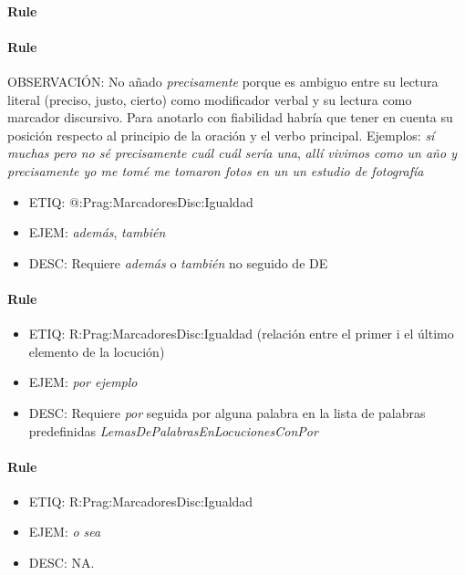 \documentclass[11pt]{report}
\begin{document}
\paragraph*{Rule}
\paragraph*{Rule}
OBSERVACIÓN: No añado \emph{precisamente} porque es ambiguo entre su lectura literal (preciso, justo, cierto) como modificador verbal y su lectura como marcador discursivo. Para anotarlo con fiabilidad habría que tener en cuenta su posición respecto al principio de la oración y el verbo principal. Ejemplos: \emph{sí muchas pero no sé precisamente cuál cuál sería una}, \emph{allí vivimos como un año y precisamente yo me tomé me tomaron fotos en un un estudio de fotografía}

\begin{itemize}
\item ETIQ: @:Prag:MarcadoresDisc:Igualdad
\item EJEM: \emph{además}, \emph{también}
\item DESC: Requiere \emph{además} o \emph{también} no seguido de DE
\end{itemize}

\paragraph*{Rule}
\begin{itemize}
\item ETIQ: R:Prag:MarcadoresDisc:Igualdad (relación entre el primer i el último elemento de la locución)
\item EJEM: \emph{por ejemplo}
\item DESC: Requiere \emph{por} seguida por alguna palabra en la lista de palabras predefinidas \emph{LemasDePalabrasEnLocucionesConPor}
\end{itemize}

\paragraph*{Rule}
\begin{itemize}
\item ETIQ: R:Prag:MarcadoresDisc:Igualdad
\item EJEM: \emph{o sea}
\item DESC: NA.
\end{itemize}
\end{document}
